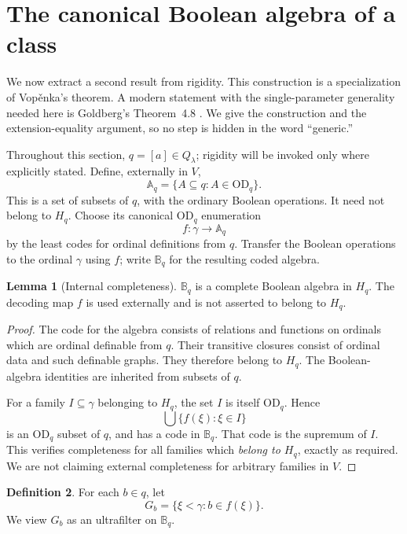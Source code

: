 \documentclass[11pt,letterpaper]{article}
\theoremstyle{definition}
\newtheorem{definition}{Definition}[section]
\newtheorem{lemma}[definition]{Lemma}
\numberwithin{equation}{section}
\newcommand{\OD}{\mathrm{OD}}
\newcommand{\BB}{\mathbb B}
\newcommand{\AlgA}{\mathbb A}
\begin{document}
\section{The canonical Boolean algebra of a class}\label{sec:boolean}

We now extract a second result from rigidity. This construction is a
specialization of Vop\v enka's theorem. A modern statement with the
single-parameter generality needed here is Goldberg's Theorem~4.8
\cite{Goldberg}. We give the construction and the extension-equality
argument, so no step is hidden in the word ``generic.''

Throughout this section, $q=[a]\in Q_\lambda$; rigidity will be invoked
only where explicitly stated. Define, externally in $V$,
\[
 \AlgA_q=\{A\subseteq q:A\in\OD_q\}.
\]
This is a set of subsets of $q$, with the ordinary Boolean operations.
It need not belong to $H_q$. Choose its canonical $\OD_q$ enumeration
\[
 f:\gamma\longrightarrow\AlgA_q
\]
by the least codes for ordinal definitions from $q$.
Transfer the Boolean operations to the ordinal $\gamma$ using $f$;
write $\BB_q$ for the resulting coded algebra.

\begin{lemma}[Internal completeness]\label{lem:complete}
$\BB_q$ is a complete Boolean algebra in $H_q$.
The decoding map $f$ is used externally and is not asserted to belong to $H_q$.
\end{lemma}
\begin{proof}
The code for the algebra consists of relations and functions on ordinals
which are ordinal definable from $q$. Their transitive closures consist
of ordinal data and such definable graphs. They therefore belong to $H_q$.
The Boolean-algebra identities are inherited from subsets of $q$.

For a family $I\subseteq\gamma$ belonging to $H_q$, the set $I$ is itself
$\OD_q$. Hence
\[
 \bigcup\{f(\xi):\xi\in I\}
\]
is an $\OD_q$ subset of $q$, and has a code in $\BB_q$. That code is the
supremum of $I$. This verifies completeness for all families which
\emph{belong to $H_q$}, exactly as required. We are not claiming external
completeness for arbitrary families in $V$.
\end{proof}

\begin{definition}
For each $b\in q$, let
\[
 G_b=\{\xi<\gamma:b\in f(\xi)\}.
\]
We view $G_b$ as an ultrafilter on $\BB_q$.
\end{definition}
\end{document}
